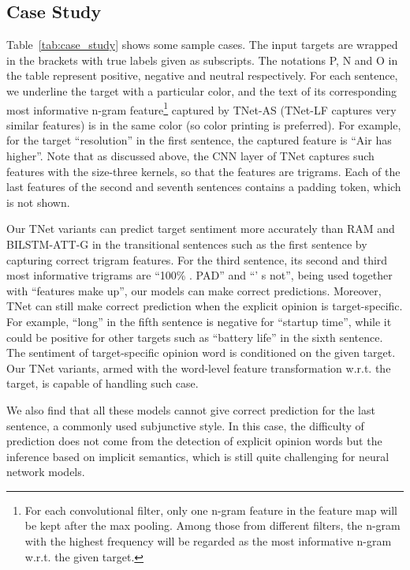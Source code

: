 \documentclass[11pt,a4paper]{article}
\begin{document}
\subsection{Case Study}
Table~\ref{tab:case_study} shows some sample cases. The input targets are wrapped in the brackets with true labels given as subscripts. The notations P, N and O in the table represent positive, negative and neutral respectively. For each sentence, we underline the target with a particular color, and the text of its corresponding most informative n-gram feature\footnote{For each convolutional filter, only one n-gram feature in the feature map will be kept after the max pooling. Among those from different filters, the n-gram with the highest frequency will be regarded as the most informative n-gram w.r.t. the given target.} captured by TNet-AS (TNet-LF captures very similar features) is in the same color (so color printing is preferred). For example, for the target ``resolution'' in the first sentence, the captured feature is ``Air has higher''. 
Note that as discussed above, the CNN layer of TNet captures such features with the size-three kernels, so that the features are trigrams. Each of the last features of the second and seventh sentences contains a padding token, which is not shown. 

Our TNet variants can predict target sentiment more accurately than RAM and BILSTM-ATT-G in the transitional sentences such as the first sentence by capturing correct trigram features. For the third sentence, its second and third most informative trigrams are ``100\% . PAD'' and ``' s not'', being used together with ``features make up'', our models can make correct predictions. 
Moreover, TNet can still make correct prediction when the explicit opinion is target-specific. For example, ``long'' in the fifth sentence is negative for ``startup time'', while it could be positive for other targets such as ``battery life'' in the sixth sentence. The sentiment of target-specific opinion word is conditioned on the given target. Our TNet variants, armed with the word-level feature transformation w.r.t. the target, is capable of handling such case.







We also find that all these models cannot give correct prediction for the last sentence, a commonly used subjunctive style. In this case, the difficulty of prediction does not come from the detection of explicit opinion words but the inference based on implicit semantics, which is still quite challenging for neural network models.
\end{document}
